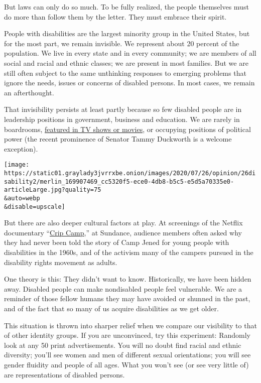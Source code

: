 But laws can only do so much. To be fully realized, the people
themselves must do more than follow them by the letter. They must
embrace their spirit.

People with disabilities are the largest minority group in the United
States, but for the most part, we remain invisible. We represent about
20 percent of the population. We live in every state and in every
community; we are members of all social and racial and ethnic classes;
we are present in most families. But we are still often subject to the
same unthinking responses to emerging problems that ignore the needs,
issues or concerns of disabled persons. In most cases, we remain an
afterthought.

That invisibility persists at least partly because so few disabled
people are in leadership positions in government, business and
education. We are rarely in boardrooms,
\href{https://www.nytimes3xbfgragh.onion/2020/07/19/arts/after-oscarssowhite-disability-waits-for-its-moment.html}{featured
in TV shows or movies}, or occupying positions of political power (the
recent prominence of Senator Tammy Duckworth is a welcome exception).

\texttt{[image: https://static01.graylady3jvrrxbe.onion/images/2020/07/26/opinion/26disability2/merlin\_169907469\_cc5320f5-ece0-4db8-b5c5-e5d5a70335e0-articleLarge.jpg?quality=75\\\&auto=webp\\\&disable=upscale]}

But there are also deeper cultural factors at play. At screenings of the
Netflix documentary
``\href{https://www.nytimes3xbfgragh.onion/2020/03/24/movies/crip-camp-review.html}{Crip
Camp},'' at Sundance, audience members often asked why they had never
been told the story of Camp Jened for young people with disabilities in
the 1960s, and of the activism many of the campers pursued in the
disability rights movement as adults.

One theory is this: They didn't want to know. Historically, we have been
hidden away. Disabled people can make nondisabled people feel
vulnerable. We are a reminder of those fellow humans they may have
avoided or shunned in the past, and of the fact that so many of us
acquire disabilities as we get older.

This situation is thrown into sharper relief when we compare our
visibility to that of other identity groups. If you are unconvinced, try
this experiment: Randomly look at any 50 print advertisements. You will
no doubt find racial and ethnic diversity; you'll see women and men of
different sexual orientations; you will see gender fluidity and people
of all ages. What you won't see (or see very little of) are
representations of disabled persons.

